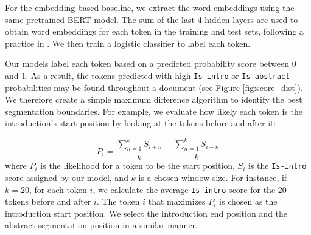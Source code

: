 For the embedding-based baseline, we extract the word embeddings using the same pretrained BERT model. The sum of the last 4 hidden layers are used to obtain word embeddings for each token in the training and test sets, following a practice in \cite{devlin2018bert}.  We then train a logistic classifier to label each token.

Our models label each token based on a predicted probability score between $0$ and $1$. As a result, the tokens predicted with high \texttt{Is-intro} or \texttt{Is-abstract} probabilities may be found throughout a document (see Figure \ref{fig:score_dist}). We therefore create a simple maximum difference algorithm to identify the best segmentation boundaries. For example, we evaluate how likely each token is the introduction's start position by looking at the tokens before and after it:

\begin{equation}
P_i = \frac{\sum_{n=1}^k{S_{i+n}}}{k} - \frac{\sum_{n=1}^k{S_{i-n}}}{k}
\end{equation}
where $P_i$ is the likelihood for a token to be the start position, $S_i$ is the \texttt{Is-intro} score assigned by our model, and $k$ is a chosen window size. For instance, if $k=20$, for each token $i$, we calculate the average \texttt{Is-intro} score for the 20 tokens before and after $i$. The token $i$ that maximizes $P_i$ is chosen as the introduction start position. We select the introduction end position and the abstract segmentation position in a similar manner.



